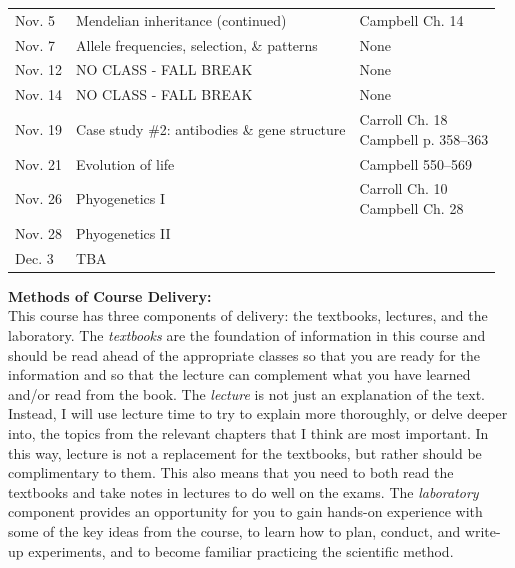 \documentclass[hidelinks]{article}
\begin{document}
\begin{table}[H]
\begin{tabular}{l p{6cm} p{6cm}}
			Nov. 5 & Mendelian inheritance (continued) & Campbell Ch. 14\\
			\addlinespace
			Nov. 7 & Allele frequencies, selection, \& patterns & None\\
			\addlinespace
			Nov. 12 & NO CLASS - FALL BREAK & None\\
			\addlinespace
			Nov. 14 & NO CLASS - FALL BREAK & None\\
			\addlinespace
			Nov. 19 & Case study \#2: antibodies \& gene structure & \makecell[tl]{Carroll Ch. 18\\ Campbell p. 358--363}\\
			\addlinespace
			Nov. 21 & Evolution of life & Campbell 550--569\\
			\addlinespace
			Nov. 26 & Phyogenetics I & \makecell[tl]{Carroll Ch. 10\\ Campbell Ch. 28}\\
			\addlinespace
			Nov. 28 & Phyogenetics II &\\
			\addlinespace
			Dec. 3 & TBA &\\
			\bottomrule
		\end{tabular}
	\end{table}	


	\newpage
	\textbf{Methods of Course Delivery:}\\
	This course has three components of delivery: the textbooks, lectures, and the laboratory. The \emph{textbooks} are the foundation of information in this course and should be read ahead of the appropriate classes so that you are ready for the information and so that the lecture can complement what you have learned and/or read from the book. The \emph{lecture} is not just an explanation of the text. Instead, I will use lecture time to try to explain more thoroughly, or delve deeper into, the topics from the relevant chapters that I think are most important. In this way, lecture is not a replacement for the textbooks, but rather should be complimentary to them. This also means that you need to both read the textbooks and take notes in lectures to do well on the exams. The \emph{laboratory} component provides an opportunity for you to gain hands-on experience with some of the key ideas from the course, to learn how to plan, conduct, and write-up experiments, and to become familiar practicing the scientific method.\\
	 

\vspace{0.3cm}
\end{document}
